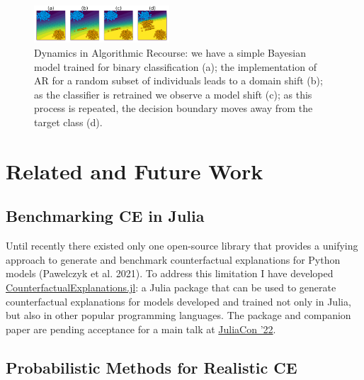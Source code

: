 \documentclass[
  sigconf]{acmart}
\begin{document}
\begin{figure}

{\centering \includegraphics[width=0.45\textwidth,height=\textheight]{www/poc.png}

}

\caption{\label{fig-dynamics}Dynamics in Algorithmic Recourse: we have a
simple Bayesian model trained for binary classification (a); the
implementation of AR for a random subset of individuals leads to a
domain shift (b); as the classifier is retrained we observe a model
shift (c); as this process is repeated, the decision boundary moves away
from the target class (d).}

\end{figure}

\hypertarget{sec-related}{%
\section{Related and Future Work}\label{sec-related}}

\hypertarget{benchmarking-ce-in-julia}{%
\subsection{Benchmarking CE in Julia}\label{benchmarking-ce-in-julia}}

Until recently there existed only one open-source library that provides
a unifying approach to generate and benchmark counterfactual
explanations for Python models (Pawelczyk et al. 2021). To address this
limitation I have developed
\href{https://www.paltmeyer.com/CounterfactualExplanations.jl/stable/}{CounterfactualExplanations.jl}:
a Julia package that can be used to generate counterfactual explanations
for models developed and trained not only in Julia, but also in other
popular programming languages. The package and companion paper are
pending acceptance for a main talk at
\href{https://juliacon.org/2022/}{JuliaCon '22}.

\hypertarget{probabilistic-methods-for-realistic-ce}{%
\subsection{Probabilistic Methods for Realistic
CE}\label{probabilistic-methods-for-realistic-ce}}
\end{document}
